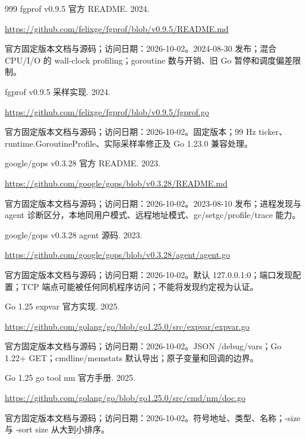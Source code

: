 \documentclass[UTF8,fontset=fandol,openany,11pt]{ctexbook}
\begin{document}
\begin{thebibliography}{999}
 fgprof v0.9.5 官方 README. 2024.\par
\url{https://github.com/felixge/fgprof/blob/v0.9.5/README.md}\par
{\small 官方固定版本文档与源码；访问日期：2026-10-02。2024-\allowbreak{}08-\allowbreak{}30 发布；混合 CPU/\allowbreak{}I/\allowbreak{}O 的 wall-\allowbreak{}clock profiling；goroutine 数与开销、旧 Go 暂停和调度偏差限制。}

 fgprof v0.9.5 采样实现. 2024.\par
\url{https://github.com/felixge/fgprof/blob/v0.9.5/fgprof.go}\par
{\small 官方固定版本文档与源码；访问日期：2026-10-02。固定版本；99 Hz ticker、runtime.\allowbreak{}GoroutineP\allowbreak{}rofile、实际采样率修正及 Go 1.\allowbreak{}23.\allowbreak{}0 兼容处理。}

 google/gops v0.3.28 官方 README. 2023.\par
\url{https://github.com/google/gops/blob/v0.3.28/README.md}\par
{\small 官方固定版本文档与源码；访问日期：2026-10-02。2023-\allowbreak{}08-\allowbreak{}10 发布；进程发现与 agent 诊断区分，本地同用户模式、远程地址模式、gc/\allowbreak{}setgc/\allowbreak{}profile/\allowbreak{}trace 能力。}

 google/gops v0.3.28 agent 源码. 2023.\par
\url{https://github.com/google/gops/blob/v0.3.28/agent/agent.go}\par
{\small 官方固定版本文档与源码；访问日期：2026-10-02。默认 127.\allowbreak{}0.\allowbreak{}0.\allowbreak{}1:\allowbreak{}0；端口发现配置；TCP 端点可能被任何同机程序访问；不能将发现约定视为认证。}

 Go 1.25 expvar 官方实现. 2025.\par
\url{https://github.com/golang/go/blob/go1.25.0/src/expvar/expvar.go}\par
{\small 官方固定版本文档与源码；访问日期：2026-10-02。JSON /\allowbreak{}debug/\allowbreak{}vars；Go 1.\allowbreak{}22+ GET；cmdline/\allowbreak{}memstats 默认导出；原子变量和回调的边界。}

 Go 1.25 go tool nm 官方手册. 2025.\par
\url{https://github.com/golang/go/blob/go1.25.0/src/cmd/nm/doc.go}\par
{\small 官方固定版本文档与源码；访问日期：2026-10-02。符号地址、类型、名称；-\allowbreak{}size 与 -\allowbreak{}sort size 从大到小排序。}


\end{thebibliography}
\end{document}
